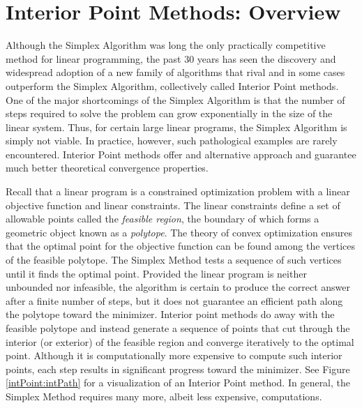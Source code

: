 
\section*{Interior Point Methods: Overview}
Although the Simplex Algorithm was long the only practically competitive method for linear programming, the past 30 years has seen the discovery and widespread adoption of a new family of algorithms that rival and in some cases outperform the Simplex Algorithm, collectively called Interior Point methods. One of the major shortcomings of the Simplex Algorithm is that the number of steps required to solve the problem can grow exponentially in the size of the linear system. Thus, for certain large linear programs, the Simplex Algorithm is simply not viable. In practice, however, such pathological examples are rarely encountered. Interior Point methods offer and alternative approach and guarantee much better theoretical convergence properties.

Recall that a linear program is a constrained optimization problem with a linear objective function and linear constraints.
The linear constraints define a set of allowable points called the \emph{feasible region}, the boundary of which forms a geometric
object known as a \emph{polytope}. The theory of convex optimization ensures that the optimal point for the objective function
can be found among the vertices of the feasible polytope. The Simplex Method tests a sequence of such vertices until it finds 
the optimal point. Provided the linear program is neither unbounded nor infeasible, the algorithm is certain to produce the correct
answer after a finite number of steps, but it does not guarantee an efficient path along the polytope toward the minimizer. Interior point methods do away with the feasible polytope and instead generate a sequence of points that cut through the interior (or 
exterior) of the feasible region and converge iteratively to the optimal point. Although it is computationally more expensive to 
compute such interior points, each step results in significant progress toward the minimizer. See Figure \ref{intPoint:intPath} for
a visualization of an Interior Point method. In general, the Simplex Method requires many more, albeit less expensive, computations.

